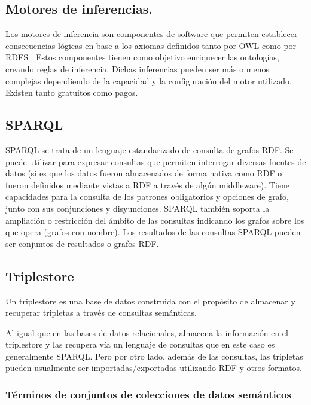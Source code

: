 \subsection{Motores de inferencias.}

Los motores de inferencia son componentes de software que permiten establecer consecuencias lógicas en base a los axiomas definidos tanto por OWL como por RDFS \cite{C.Trim}.
Estos componentes tienen como objetivo enriquecer las ontologías, creando reglas de inferencia. 
Dichas inferencias pueden ser más o menos complejas dependiendo de la capacidad y la configuración del motor utilizado. Existen tanto gratuitos 
como pagos.


\subsection{SPARQL}

SPARQL se trata de un lenguaje estandarizado de consulta de grafos RDF.
Se puede utilizar para expresar consultas que permiten interrogar diversas fuentes de datos (si es que los datos fueron almacenados 
de forma nativa como RDF o fueron definidos mediante vistas a RDF a través de algún middleware). Tiene capacidades para la consulta
de los patrones obligatorios y opciones de grafo, junto con sus conjunciones y disyunciones. SPARQL también soporta 
la ampliación o restricción del ámbito de las consultas indicando los grafos sobre los que opera (grafos con nombre). Los resultados de las consultas
SPARQL pueden ser conjuntos de resultados o grafos RDF.

\subsection{Triplestore}
Un triplestore es una base de datos construida con el propósito de almacenar y recuperar tripletas \cite{Rusher} a través de consultas semánticas.

Al igual que en las bases de datos relacionales, almacena la información en el triplestore y las recupera vía un lenguaje de consultas que en este caso es generalmente SPARQL. 
Pero por otro lado, además de las consultas, las tripletas pueden usualmente ser importadas/exportadas utilizando RDF y otros formatos.

\subsubsection{Términos de conjuntos de colecciones de datos semánticos}

